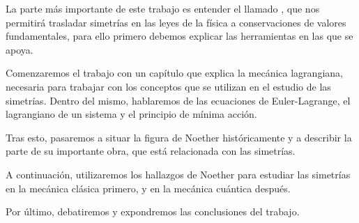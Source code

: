 La parte más importante de este trabajo es entender el llamado , que nos permitirá trasladar simetrías en las leyes de la física a conservaciones de valores fundamentales, para ello primero debemos explicar las herramientas en las que se apoya.

Comenzaremos el trabajo con un capítulo que explica la mecánica lagrangiana, necesaria para trabajar con los conceptos que se utilizan en el estudio de las simetrías. Dentro del mismo, hablaremos de las ecuaciones de Euler-Lagrange, el lagrangiano de un sistema y el principio de mínima acción.

Tras esto, pasaremos a situar la figura de Noether históricamente y a describir la parte de su importante obra, que está relacionada con las simetrías.

A continuación, utilizaremos los hallazgos de Noether para estudiar las simetrías en la mecánica clásica primero, y en la mecánica cuántica después.

Por último, debatiremos y expondremos las conclusiones del trabajo.